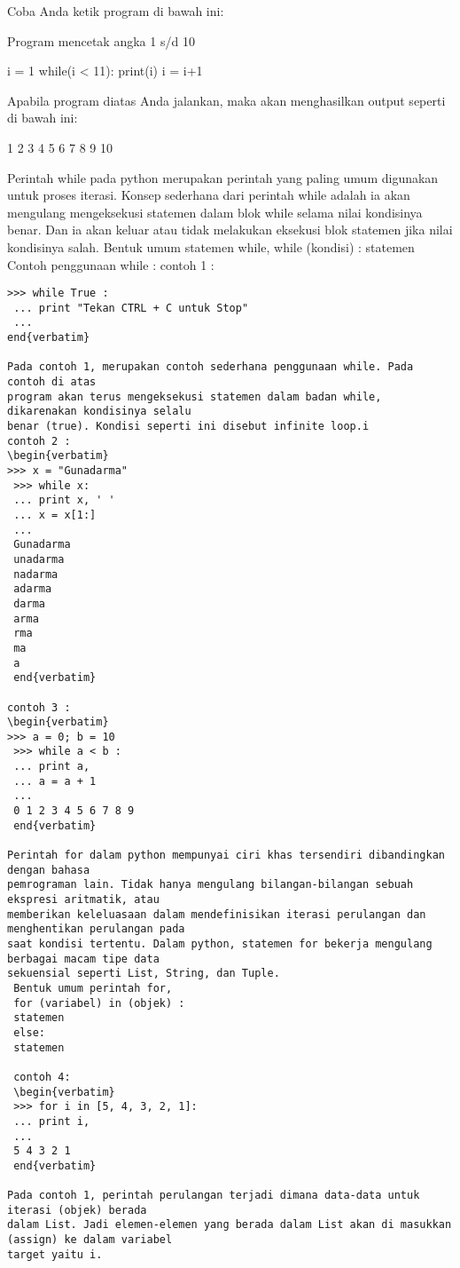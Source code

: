Coba Anda ketik program di bawah ini:

 
Program mencetak angka 1 s/d 10 

i = 1 
while(i < 11): 
 print(i) 
 i = i+1 

Apabila program diatas Anda jalankan, maka akan menghasilkan output seperti di bawah ini:

 
1 
2 
3 
4 
5 
6 
7 
8 
9 
10 

Perintah while pada python merupakan perintah yang paling umum digunakan untuk proses
iterasi. Konsep sederhana dari perintah while adalah ia akan mengulang mengeksekusi statemen dalam
blok while selama nilai kondisinya benar. Dan ia akan keluar atau tidak melakukan eksekusi blok
statemen jika nilai kondisinya salah.
 Bentuk umum statemen while,
 while (kondisi) :
 statemen
 Contoh penggunaan while :
contoh 1 : 
\begin{verbatim}
>>> while True :
 ... print "Tekan CTRL + C untuk Stop"
 ...
end{verbatim}

Pada contoh 1, merupakan contoh sederhana penggunaan while. Pada contoh di atas
program akan terus mengeksekusi statemen dalam badan while, dikarenakan kondisinya selalu
benar (true). Kondisi seperti ini disebut infinite loop.i
contoh 2 : 
\begin{verbatim}
>>> x = "Gunadarma"
 >>> while x:
 ... print x, ' '
 ... x = x[1:]
 ...
 Gunadarma
 unadarma
 nadarma
 adarma
 darma
 arma
 rma
 ma
 a
 end{verbatim}
 
contoh 3 : 
\begin{verbatim}
>>> a = 0; b = 10
 >>> while a < b :
 ... print a,
 ... a = a + 1
 ...
 0 1 2 3 4 5 6 7 8 9
 end{verbatim}

Perintah for dalam python mempunyai ciri khas tersendiri dibandingkan dengan bahasa
pemrograman lain. Tidak hanya mengulang bilangan-bilangan sebuah ekspresi aritmatik, atau
memberikan keleluasaan dalam mendefinisikan iterasi perulangan dan menghentikan perulangan pada
saat kondisi tertentu. Dalam python, statemen for bekerja mengulang berbagai macam tipe data
sekuensial seperti List, String, dan Tuple.
 Bentuk umum perintah for,
 for (variabel) in (objek) :
 statemen
 else:
 statemen 
 
 contoh 4:
 \begin{verbatim}
 >>> for i in [5, 4, 3, 2, 1]:
 ... print i,
 ...
 5 4 3 2 1 
 end{verbatim}
 
Pada contoh 1, perintah perulangan terjadi dimana data-data untuk iterasi (objek) berada
dalam List. Jadi elemen-elemen yang berada dalam List akan di masukkan (assign) ke dalam variabel
target yaitu i. 


\end{verbatim}

